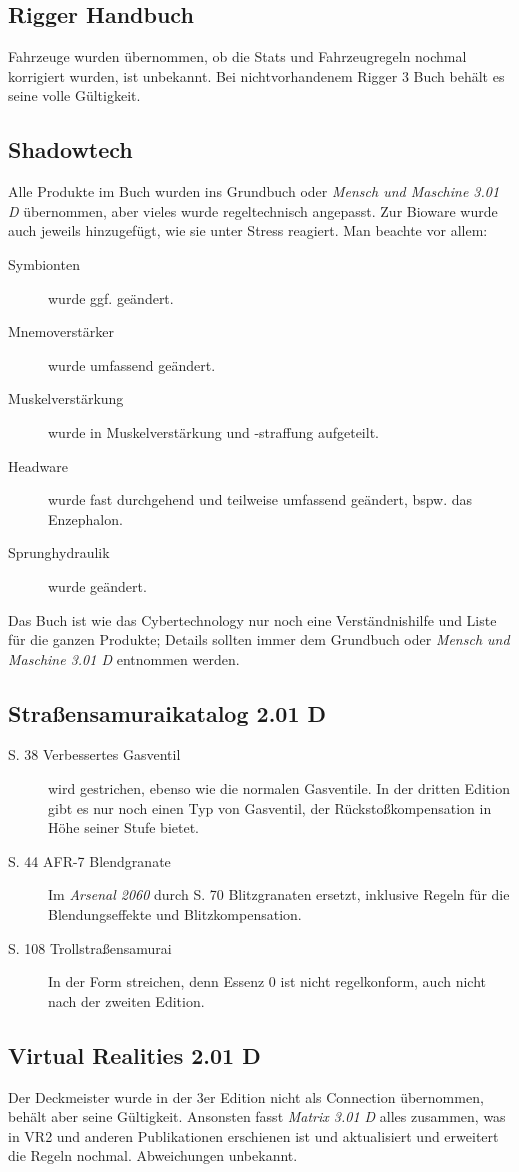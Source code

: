 \documentclass[a4paper]{scrartcl}
\begin{document}
\subsection{Rigger Handbuch}
Fahrzeuge wurden übernommen, ob die Stats und Fahrzeugregeln nochmal korrigiert wurden, ist unbekannt. Bei nichtvorhandenem Rigger 3 Buch behält es seine volle Gültigkeit.

\subsection{Shadowtech}
Alle Produkte im Buch wurden ins Grundbuch oder \textit{Mensch und Maschine 3.01 D} übernommen, aber vieles wurde regeltechnisch angepasst. Zur Bioware wurde auch jeweils hinzugefügt, wie sie unter Stress reagiert. Man beachte vor allem:
\begin{description}
 \item[Symbionten] wurde ggf. geändert.
 \item[Mnemoverstärker] wurde umfassend geändert.
 \item[Muskelverstärkung] wurde in Muskelverstärkung und -straffung aufgeteilt.
 \item[Headware] wurde fast durchgehend und teilweise umfassend geändert, bspw. das Enzephalon.
 \item[Sprunghydraulik] wurde geändert.
\end{description}
Das Buch ist wie das Cybertechnology nur noch eine Verständnishilfe und Liste für die ganzen Produkte; Details sollten immer dem Grundbuch oder \textit{Mensch und Maschine 3.01 D} entnommen werden.

\subsection{Straßensamuraikatalog 2.01 D}
\begin{description}
 \item[S. 38 Verbessertes Gasventil] wird gestrichen, ebenso wie die normalen Gasventile. In der dritten Edition gibt es nur noch einen Typ von Gasventil, der Rückstoßkompensation in Höhe seiner Stufe bietet.
 \item[S. 44 AFR-7 Blendgranate] Im \textit{Arsenal 2060} durch S. 70 Blitzgranaten ersetzt, inklusive Regeln für die Blendungseffekte und Blitzkompensation.
 \item[S. 108 Trollstraßensamurai] In der Form streichen, denn Essenz 0 ist nicht regelkonform, auch nicht nach der zweiten Edition.
\end{description}

\subsection{Virtual Realities 2.01 D}
Der Deckmeister wurde in der 3er Edition nicht als Connection übernommen, behält aber seine Gültigkeit. Ansonsten fasst \textit{Matrix 3.01 D} alles zusammen, was in VR2 und anderen Publikationen erschienen ist und aktualisiert und erweitert die Regeln nochmal. Abweichungen unbekannt.
\end{document}
